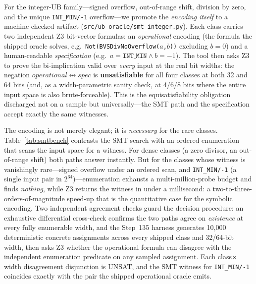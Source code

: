 \documentclass[10pt,a4paper]{article}
\begin{document}
For the integer-UB family---signed overflow, out-of-range shift, division by
zero, and the unique \texttt{INT\_MIN/-1} overflow---we promote the
\emph{encoding itself} to a machine-checked artifact
(\texttt{src/ub\_oracle/smt\_integer.py}). Each class carries two independent Z3
bit-vector formulas: an \emph{operational} encoding (the formula the shipped
oracle solves, e.g.\ \texttt{Not(BVSDivNoOverflow($a$,$b$))} excluding
$b=0$) and a human-readable \emph{specification} (e.g.\ $a=\texttt{INT\_MIN}
\wedge b=-1$). The tool then asks Z3 to prove the bi-implication valid over
\emph{every} input at the real bit widths: the negation
$\mathit{operational} \not\leftrightarrow \mathit{spec}$ is
\textbf{unsatisfiable} for all four classes at both 32 and 64 bits (and, as a
width-parametric sanity check, at 4/6/8 bits where the entire input space is
also brute-forceable). This is the equisatisfiability obligation discharged not
on a sample but universally---the SMT path and the specification accept exactly
the same witnesses.

The encoding is not merely elegant; it is \emph{necessary} for the rare classes.
Table~\ref{tab:smtbench} contrasts the SMT search with an ordered enumeration
that scans the input space for a witness. For dense classes (a zero divisor, an
out-of-range shift) both paths answer instantly. But for the classes whose
witness is vanishingly rare---signed overflow under an ordered scan, and
\texttt{INT\_MIN/-1} (a single input pair in $2^{64}$)---enumeration exhausts a
multi-million-probe budget and finds \emph{nothing}, while Z3 returns the
witness in under a millisecond: a two-to-three-orders-of-magnitude speed-up that
is the quantitative case for the symbolic encoding. Two independent agreement
checks guard the decision procedure: an exhaustive differential cross-check
confirms the two paths agree on \emph{existence} at every fully enumerable
width, and the Step~135 harness generates 10{,}000 deterministic concrete
assignments across every shipped class and 32/64-bit width, then asks Z3 whether
the operational formula can disagree with the independent enumeration predicate
on any sampled assignment. Each class$\times$width disagreement disjunction is
UNSAT, and the SMT witness for \texttt{INT\_MIN/-1} coincides exactly with the
pair the shipped operational oracle emits.
\end{document}

